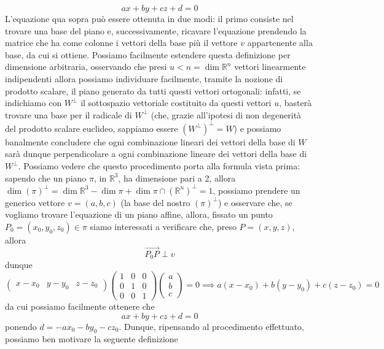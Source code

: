 \begin{equation}
ax + by + cz + d = 0
\end{equation}
L'equazione qua sopra può essere ottenuta in due modi: il primo consiste nel trovare una base del piano e, successivamente, ricavare l'equazione prendendo la matrice che ha come colonne i vettori della base più il vettore $v$ appartenente alla base, da cui si ottiene. Possiamo facilmente estendere questa definizione per dimensione arbitraria, osservando che presi $u < n = \dim{\mathbb{R}^n}$ vettori linearmente indipendenti allora possiamo individuare facilmente, tramite la nozione di prodotto scalare, il piano generato da tutti questi vettori ortogonali: infatti, se indichiamo con $W^{\perp}$ il sottospazio vettoriale costituito da questi vettori $u$, basterà trovare una base per il radicale di $W^{\perp}$ (che, grazie all'ipotesi di non degenerità del prodotto scalare euclideo, sappiamo essere $(W^{\perp})^{\perp} = W$) e possiamo banalmente concludere che ogni combinazione lineari dei vettori della base di $W$ sarà dunque perpendicolare a ogni combinazione lineare dei vettori della base di $W^{\perp}$. Possiamo vedere che questo procedimento porta alla formula vista prima: sapendo che un piano $\pi$, in $\mathbb{R}^3$, ha dimensione pari a 2, allora $\dim{(\pi)^{\perp}} = \dim{\mathbb{R}^3} - \dim{\pi} + \dim{\pi \cap (\mathbb{R}^n)^{\perp}} = 1$, possiamo prendere un generico vettore $v = (a, b, c)$ (la base del nostro $(\pi)^{\perp}$) e osservare che, se vogliamo trovare l'equazione di un piano affine, allora, fissato un punto $P_0 = (x_0, y_0, z_0) \in \pi$ siamo interessati a verificare che, preso $P = (x, y, z)$, allora
$$
\vec{P_0P} \perp v
$$
dunque
$$
\begin{pmatrix}
	x - x_0 & y-y_0 & z-z_0
\end{pmatrix} \begin{pmatrix}
1 & 0 & 0 \\
0 & 1 & 0 \\
0 & 0 & 1
\end{pmatrix} \begin{pmatrix}
a \\
b \\
c
\end{pmatrix} = 0 \implies
a(x-x_0) + b(y-y_0) + c(z-z_0) = 0
$$
da cui possiamo facilmente ottenere che
$$
ax+by +cz + d  = 0
$$
ponendo $d = - ax_0 - by_0 - cz_0$. Dunque, ripensando al procedimento effettuato, possiamo ben motivare la seguente definizione
